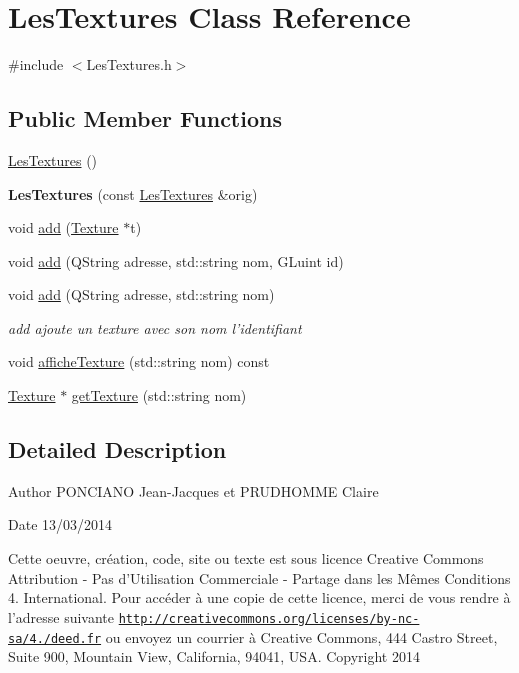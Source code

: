 \hypertarget{classLesTextures}{\section{Les\-Textures Class Reference}
\label{classLesTextures}
}


{\ttfamily \#include $<$Les\-Textures.\-h$>$}

\subsection*{Public Member Functions}
\begin{DoxyCompactItemize}
\item 
\hyperlink{classLesTextures_ae10396e044c7aa1749467834e5db8511}{Les\-Textures} ()
\item 
\hypertarget{classLesTextures_a3429b8579023d848474c9b109cc83a29}{{\bfseries Les\-Textures} (const \hyperlink{classLesTextures}{Les\-Textures} \&orig)}\label{classLesTextures_a3429b8579023d848474c9b109cc83a29}

\item 
void \hyperlink{classLesTextures_af3f3b9cde73b9f07abc980c62d26f0b0}{add} (\hyperlink{classTexture}{Texture} $\ast$t)
\item 
void \hyperlink{classLesTextures_aa55360dbfbc2d2799e0fdd4ba0167450}{add} (Q\-String adresse, std\-::string nom, G\-Luint id)
\item 
void \hyperlink{classLesTextures_a0132a8028f2fc67160268f80c4c79d63}{add} (Q\-String adresse, std\-::string nom)
\begin{DoxyCompactList}\small\item\em add ajoute un texture avec son nom l'identifiant \end{DoxyCompactList}\item 
void \hyperlink{classLesTextures_a02432688ee521372e71b7d0b32cd2b02}{affiche\-Texture} (std\-::string nom) const 
\item 
\hyperlink{classTexture}{Texture} $\ast$ \hyperlink{classLesTextures_ad41096dedc9ab42f0d9d4e93bc4a0794}{get\-Texture} (std\-::string nom)
\end{DoxyCompactItemize}


\subsection{Detailed Description}
\begin{DoxyAuthor}{Author}
P\-O\-N\-C\-I\-A\-N\-O Jean-\/\-Jacques et P\-R\-U\-D\-H\-O\-M\-M\-E Claire 
\end{DoxyAuthor}
\begin{DoxyDate}{Date}
13/03/2014
\end{DoxyDate}
Cette oeuvre, création, code, site ou texte est sous licence Creative Commons Attribution -\/ Pas d’\-Utilisation Commerciale -\/ Partage dans les Mêmes Conditions 4. International. Pour accéder à une copie de cette licence, merci de vous rendre à l'adresse suivante \href{http://creativecommons.org/licenses/by-nc-sa/4.0/deed.fr}{\tt http\-://creativecommons.\-org/licenses/by-\/nc-\/sa/4./deed.\-fr} ou envoyez un courrier à Creative Commons, 444 Castro Street, Suite 900, Mountain View, California, 94041, U\-S\-A. Copyright 2014

